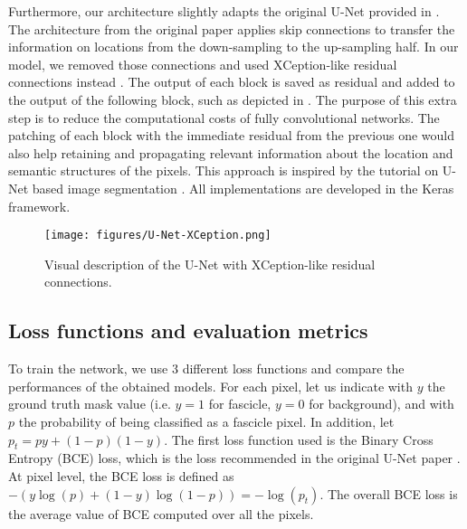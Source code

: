 \documentclass[conference]{IEEEtran}
\begin{document}
Furthermore, our architecture slightly adapts the original U-Net provided in \cite{unet}. The architecture from the original paper applies skip connections to transfer the information on locations from the down-sampling to the up-sampling half. In our model, we removed those connections and used XCeption-like residual connections instead \cite{xception}. The output of each block is saved as residual and added to the output of the following block, such as depicted in . The purpose of this extra step is to reduce the computational costs of fully convolutional networks. The patching of each block with the immediate residual from the previous one would also help retaining and propagating relevant information about the location and semantic structures of the pixels. This approach is inspired by the tutorial on U-Net based image segmentation \cite{unet_keras}. All implementations are developed in the Keras framework.

\begin{figure}[ht]
\centering
\texttt{[image: figures/U-Net-XCeption.png]}
\caption{Visual description of the U-Net with XCeption-like residual connections.}
\label{fig:unet}
\end{figure}

\subsection{Loss functions and evaluation metrics}
To train the network, we use 3 different loss functions and compare the performances of the obtained models. For each pixel, let us indicate with $y$ the ground truth mask value (i.e. $y=1$ for fascicle, $y=0$ for background), and with $p$ the probability of being classified as a fascicle pixel. In addition, let $p_t = py+(1-p)(1-y)$. The first loss function used is the Binary Cross Entropy (BCE) loss, which is the loss recommended in the original U-Net paper \cite{unet}. At pixel level, the BCE loss is defined as $-(y\log(p)+(1-y)\log(1-p))=-\log(p_t)$. The overall BCE loss is the average value of BCE computed over all the pixels. 
\end{document}
